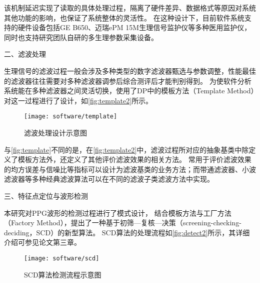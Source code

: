 该机制延迟实现了读取的具体处理过程，隔离了硬件差异、数据格式等原因对系统其他功能的影响，也保证了系统整体的灵活性。
在这种设计下，目前软件系统支持的硬件设备包括GE B650、迈瑞ePM 15M生理信号监护仪等多种医用监护仪，
同时也支持研究团队自研的多生理参数采集设备。

二、滤波处理

生理信号的滤波过程一般会涉及多种类型的数字滤波器甄选与参数调整，性能最佳的滤波器往往需要对多种滤波器调参后综合测评后才能判别得到。
为使软件分析系统能在多种滤波器之间灵活切换，使用了DP中的模板方法（Template Method）对这一过程进行了设计\cite{Enrich2018}，如\autoref{fig:template2}所示。
\begin{figure}[htbp]
    \centering
    \texttt{[image: software/template]}
    \caption{\label{fig:template2}滤波处理设计示意图}
\end{figure}


与\autoref{fig:template}不同的是，在\autoref{fig:template2}中，滤波过程所对应的抽象基类中除定义了模板方法外，还定义了其他评价滤波效果的相关方法。
常用于评价滤波效果的均方误差与信噪比等指标可以设计为滤波基类的业务方法；而带通滤波器、小波滤波器等多种经典滤波算法可以在不同的滤波子类滤波方法中实现。

三、特征点定位与波形检测

本研究对PPG波形的检测过程进行了模式设计，
结合模板方法与工厂方法（Factory Method）\cite{Enrich2018}，提出了一种基于初筛—复核—决策（screening-checking-deciding，SCD）的新型算法。
SCD算法的处理流程如\autoref{fig:detect2}所示，其详细介绍可参见论文第三章。
\begin{figure}[htbp]
    \centering
    \texttt{[image: software/scd]}
    \caption{\label{fig:detect2}SCD算法检测流程示意图}
\end{figure}



